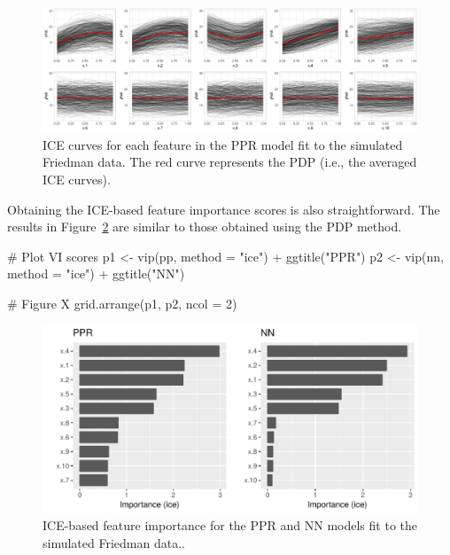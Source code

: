 
\begin{figure}[!htb]
  \centering 
  \includegraphics[width=1\linewidth]{figures/ice-ppr} 
  \caption{ICE curves for each feature in the PPR model fit to the simulated Friedman data. The red curve represents the PDP (i.e., the averaged ICE curves).}
  \label{fig:ice-ppr}
\end{figure}

Obtaining the ICE-based feature importance scores is also straightforward. The results in Figure~\ref{fig:vip-ice-ppr-nn} are similar to those obtained using the PDP method.

\begin{example}
# Plot VI scores
p1 <- vip(pp, method = "ice") + ggtitle("PPR")
p2 <- vip(nn, method = "ice") + ggtitle("NN")

# Figure X
grid.arrange(p1, p2, ncol = 2)
\end{example}

\begin{figure}[!htb]
  \centering 
  \includegraphics[width=1\linewidth]{figures/vip-ice-ppr-nn} 
  \caption{ICE-based feature importance for the PPR and NN models fit to the simulated Friedman data..}
  \label{fig:vip-ice-ppr-nn}
\end{figure}

